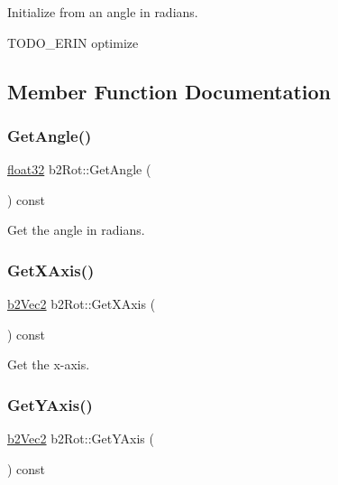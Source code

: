 Initialize from an angle in radians. 

T\+O\+D\+O\+\_\+\+E\+R\+IN optimize 

\subsection{Member Function Documentation}
\mbox{\label{structb2_rot_a45031fccfa11d3b3a09154008ce28b39}} 
\subsubsection{\texorpdfstring{GetAngle()}{GetAngle()}}
{\footnotesize\ttfamily \mbox{\hyperlink{b2_settings_8h_aacdc525d6f7bddb3ae95d5c311bd06a1}{float32}} b2\+Rot\+::\+Get\+Angle (\begin{DoxyParamCaption}{ }\end{DoxyParamCaption}) const\hspace{0.3cm}{\ttfamily [inline]}}



Get the angle in radians. 

\mbox{\label{structb2_rot_a952a5555c1f68ce3e39ac992fcf4eba9}} 
\subsubsection{\texorpdfstring{GetXAxis()}{GetXAxis()}}
{\footnotesize\ttfamily \mbox{\hyperlink{structb2_vec2}{b2\+Vec2}} b2\+Rot\+::\+Get\+X\+Axis (\begin{DoxyParamCaption}{ }\end{DoxyParamCaption}) const\hspace{0.3cm}{\ttfamily [inline]}}



Get the x-\/axis. 

\mbox{\label{structb2_rot_ab057c4e9dc821099949391a6ded36dd6}} 
\subsubsection{\texorpdfstring{GetYAxis()}{GetYAxis()}}
{\footnotesize\ttfamily \mbox{\hyperlink{structb2_vec2}{b2\+Vec2}} b2\+Rot\+::\+Get\+Y\+Axis (\begin{DoxyParamCaption}{ }\end{DoxyParamCaption}) const\hspace{0.3cm}{\ttfamily [inline]}}



